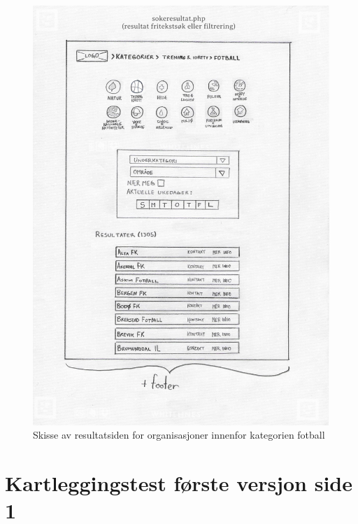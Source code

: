 \begin{figure}[H]
\centering
\includegraphics[width=.9\textwidth]{Illustrasjoner/Skisser-pdf/1.0/1-5-resultat-med-filtrering.pdf}
\caption{Skisse av resultatsiden for organisasjoner innenfor kategorien fotball}
\label{vedlegg:1-5-resultat-filt}
\end{figure}

\section{Kartleggingstest første versjon side 1}

